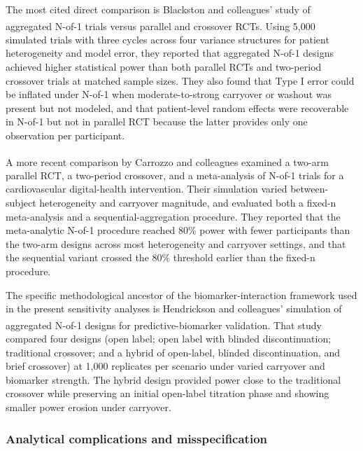 \documentclass[
  11pt,
]{article}
\begin{document}
The most cited direct comparison is Blackston and colleagues' study of
aggregated N-of-1 trials versus parallel and crossover
RCTs\textsuperscript{}.
Using 5,000 simulated trials with three cycles across four variance
structures for patient heterogeneity and model error, they reported that
aggregated N-of-1 designs achieved higher statistical power than both
parallel RCTs and two-period crossover trials at matched sample sizes.
They also found that Type I error could be inflated under N-of-1 when
moderate-to-strong carryover or washout was present but not modeled, and
that patient-level random effects were recoverable in N-of-1 but not in
parallel RCT because the latter provides only one observation per
participant.

A more recent comparison by Carrozzo and
colleagues\textsuperscript{}
examined a two-arm parallel RCT, a two-period crossover, and a
meta-analysis of N-of-1 trials for a cardiovascular digital-health
intervention. Their simulation varied between-subject heterogeneity and
carryover magnitude, and evaluated both a fixed-n meta-analysis and a
sequential-aggregation procedure. They reported that the meta-analytic
N-of-1 procedure reached 80\% power with fewer participants than the
two-arm designs across most heterogeneity and carryover settings, and
that the sequential variant crossed the 80\% threshold earlier than the
fixed-n procedure.

The specific methodological ancestor of the biomarker-interaction
framework used in the present sensitivity analyses is Hendrickson and
colleagues' simulation of aggregated N-of-1 designs for
predictive-biomarker
validation\textsuperscript{}.
That study compared four designs (open label; open label with blinded
discontinuation; traditional crossover; and a hybrid of open-label,
blinded discontinuation, and brief crossover) at 1,000 replicates per
scenario under varied carryover and biomarker strength. The hybrid
design provided power close to the traditional crossover while
preserving an initial open-label titration phase and showing smaller
power erosion under carryover.

\subsubsection{Analytical complications and
misspecification}\label{analytical-complications-and-misspecification}
\end{document}
